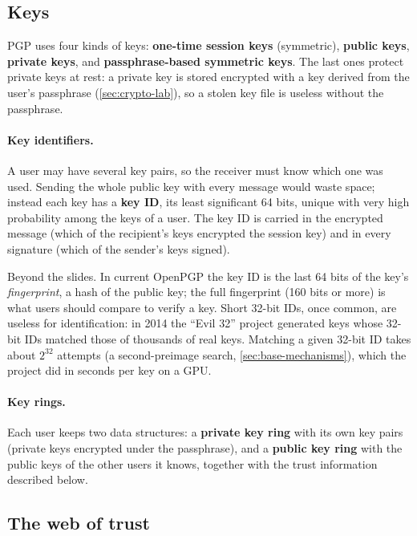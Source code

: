 \subsection{Keys}

PGP uses four kinds of keys: \textbf{one-time session keys} (symmetric), \textbf{public keys}, \textbf{private keys}, and \textbf{passphrase-based symmetric keys}. The last ones protect private keys at rest: a private key is stored encrypted with a key derived from the user's passphrase (\cref{sec:crypto-lab}), so a stolen key file is useless without the passphrase.

\paragraph{Key identifiers.} A user may have several key pairs, so the receiver must know which one was used. Sending the whole public key with every message would waste space; instead each key has a \textbf{key ID}, its least significant 64 bits, unique with very high probability among the keys of a user. The key ID is carried in the encrypted message (which of the recipient's keys encrypted the session key) and in every signature (which of the sender's keys signed).

\begin{remark}
Beyond the slides. In current OpenPGP the key ID is the last 64 bits of the key's \emph{fingerprint}, a hash of the public key; the full fingerprint (160 bits or more) is what users should compare to verify a key. Short 32-bit IDs, once common, are useless for identification: in 2014 the \enquote{Evil 32} project generated keys whose 32-bit IDs matched those of thousands of real keys. Matching a given 32-bit ID takes about $2^{32}$ attempts (a second-preimage search, \cref{sec:base-mechanisms}), which the project did in seconds per key on a GPU.
\end{remark}

\paragraph{Key rings.} Each user keeps two data structures: a \textbf{private key ring} with its own key pairs (private keys encrypted under the passphrase), and a \textbf{public key ring} with the public keys of the other users it knows, together with the trust information described below.

\subsection{The web of trust}

